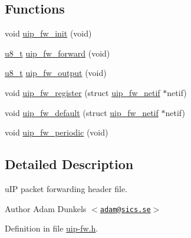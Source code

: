 \subsection*{Functions}
\begin{DoxyCompactItemize}
\item 
void \hyperlink{group__uipfw_ga0c90f476e0557afaee479c61d4d3eaf3}{uip\_\-fw\_\-init} (void)
\item 
\hyperlink{group__uipfw_ga4caecabca98b43919dd11be1c0d4cd8e}{u8\_\-t} \hyperlink{group__uipfw_ga208866aad58f1fb9d5f9e37713f9f4e5}{uip\_\-fw\_\-forward} (void)
\item 
\hyperlink{group__uipfw_ga4caecabca98b43919dd11be1c0d4cd8e}{u8\_\-t} \hyperlink{group__uipfw_gabc6fe2d1544b0a16ee3f3fc1c1ccf93a}{uip\_\-fw\_\-output} (void)
\item 
void \hyperlink{group__uipfw_gaa2d5cfe32c9ec743e956c4e19dcee21a}{uip\_\-fw\_\-register} (struct \hyperlink{structuip__fw__netif}{uip\_\-fw\_\-netif} $\ast$netif)
\item 
void \hyperlink{group__uipfw_ga94dcf0fa8bff34949a37fbde77786f82}{uip\_\-fw\_\-default} (struct \hyperlink{structuip__fw__netif}{uip\_\-fw\_\-netif} $\ast$netif)
\item 
void \hyperlink{group__uipfw_ga35ab515cdae08d65c5d080771754f62a}{uip\_\-fw\_\-periodic} (void)
\end{DoxyCompactItemize}


\subsection{Detailed Description}
uIP packet forwarding header file. \begin{DoxyAuthor}{Author}
Adam Dunkels $<$\href{mailto:adam@sics.se}{\tt adam@sics.se}$>$ 
\end{DoxyAuthor}


Definition in file \hyperlink{uip-fw_8h_source}{uip-\/fw.h}.

